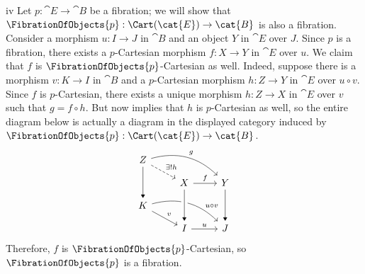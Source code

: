\begin{partsolution}{iv}
Let \(p : \cat{E} \to \cat{B}\) be a fibration; we will show that \(\FibrationOfObjects{p} : \Cart(\cat{E}) \to \cat{B}\) is also a fibration.
Consider a morphism \(u : I \to J\) in \(\cat{B}\) and an object \(Y\) in \(\cat{E}\) over \(J\).
Since \(p\) is a fibration, there exists a \(p\)-Cartesian morphism \(f : X \to Y\) in \(\cat{E}\) over \(u\).
We claim that \(f\) is \(\FibrationOfObjects{p}\)-Cartesian as well.
Indeed, suppose there is a morphism \(v : K \to I\) in \(\cat{B}\) and a \(p\)-Cartesian morphism \(h : Z \to Y\) in \(\cat{E}\) over \(u \circ v\).
Since \(f\) is \(p\)-Cartesian, there exists a unique morphism \(h : Z \to X\) in \(\cat{E}\) over \(v\) such that \(g = f \circ h\).
But now  implies that \(h\) is \(p\)-Cartesian as well, so the entire diagram below is actually a diagram in the displayed category induced by \(\FibrationOfObjects{p} : \Cart(\cat{E}) \to \cat{B}\).
\begin{equation*}
\begin{tikzcd}[row sep=small]
Z \arrow[rd, dashed, "\exists! h"] \arrow[rrd, bend left, "g"] \arrow[dd, -Triangle] \\
& X \arrow[r, "f"] & Y \arrow[dd, -Triangle] \\
K \arrow[rd, "v"] \arrow[rrd, bend left, near end, "u \circ v"] \\
& I \arrow[r, "u"] & J
\arrow[from=uul, to=l, -Triangle, crossing over]
\end{tikzcd}
\end{equation*}
Therefore, \(f\) is \(\FibrationOfObjects{p}\)-Cartesian, so \(\FibrationOfObjects{p}\) is a fibration.
\end{partsolution}
